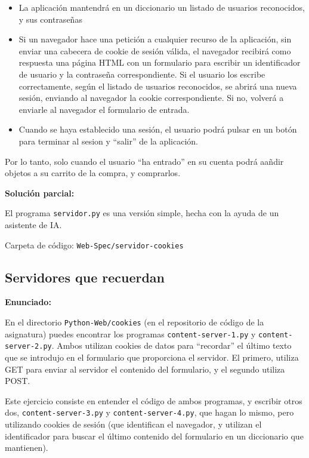 \begin{itemize}
\item La aplicación mantendrá en un diccionario un listado de usuarios reconocidos, y sus contraseñas
\item Si un navegador hace una petición a cualquier recurso de la aplicación, sin enviar una cabecera de cookie de sesión válida, el navegador recibirá como respuesta una página HTML con un formulario para escribir un identificador de usuario y la contraseña correspondiente. Si el usuario los escribe correctamente, según el listado de usuarios reconocidos, se abrirá una nueva sesión, enviando al navegador la cookie correspondiente. Si no, volverá a enviarle al navegador el formulario de entrada.
\item Cuando se haya establecido una sesión, el usuario podrá pulsar en un botón para terminar al sesion y ``salir'' de la aplicación.
\end{itemize}

Por lo tanto, solo cuando el usuario ``ha entrado'' en su cuenta podrá aañdir objetos a su carrito de la compra, y comprarlos.

\textbf{Solución parcial:}

El programa \texttt{servidor.py} es una versión simple, hecha con la ayuda de un asistente de IA.

Carpeta de código: \texttt{Web-Spec/servidor-cookies}


\subsection{Servidores que recuerdan}
\label{subsec:servidores-recuerdan}

\textbf{Enunciado:}

En el directorio \verb|Python-Web/cookies| (en el repositorio de código de la asignatura) puedes encontrar los programas \verb|content-server-1.py| y \verb|content-server-2.py|. Ambos utilizan cookies de datos para ``recordar'' el último texto que se introdujo en el formulario que proporciona el servidor. El primero, utiliza GET para enviar al servidor el contenido del formulario, y el segundo utiliza POST.

Este ejercicio consiste en entender el código de ambos programas, y escribir otros dos, \verb|content-server-3.py| y \verb|content-server-4.py|, que hagan lo mismo, pero utilizando cookies de sesión (que identifican el navegador, y utilizan el identificador para buscar el último contenido del formulario en un diccionario que mantienen).

